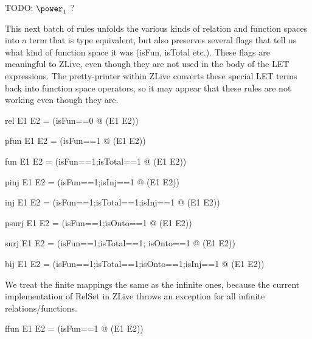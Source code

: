 \documentclass{article}
\begin{document}
TODO: $\power_1$ ?

This next batch of rules unfolds the various kinds of relation
and function spaces into a term that is type equivalent, but also
preserves several flags that tell us what kind of function space
it was (isFun, isTotal etc.).  These flags are meaningful to ZLive, 
even though they are not used in the body of the LET expressions.
The pretty-printer within ZLive converts these special LET terms
back into function space operators, so it may appear that these rules
are not working even though they are.

\begin{zedrule}{rel}
   E1 \rel E2 = (\LET isFun==0 @ \power (E1 \cross E2))
\end{zedrule}

\begin{zedrule}{pfun}
   E1 \pfun E2 = (\LET isFun==1 @ \power (E1 \cross E2))
\end{zedrule}

\begin{zedrule}{fun}
   E1 \fun E2 = (\LET isFun==1;isTotal==1 @ \power (E1 \cross E2))
\end{zedrule}

\begin{zedrule}{pinj}
   E1 \pinj E2 = (\LET isFun==1;isInj==1 @ \power (E1 \cross E2))
\end{zedrule}

\begin{zedrule}{inj}
   E1 \inj E2 = (\LET isFun==1;isTotal==1;isInj==1 @ \power (E1 \cross E2))
\end{zedrule}

\begin{zedrule}{psurj}
   E1 \psurj E2 = (\LET isFun==1;isOnto==1 @ \power (E1 \cross E2))
\end{zedrule}

\begin{zedrule}{surj}
   E1 \surj E2 = (\LET isFun==1;isTotal==1; isOnto==1 @ \power (E1 \cross E2))
\end{zedrule}

\begin{zedrule}{bij}
   E1 \bij E2 = (\LET isFun==1;isTotal==1;isOnto==1;isInj==1 
                  @ \power (E1 \cross E2))
\end{zedrule}

We treat the finite mappings the same as the infinite ones,
because the current implementation of RelSet in ZLive
throws an exception for all infinite relations/functions.
\begin{zedrule}{ffun}
   E1 \ffun E2 = (\LET isFun==1 @ \power (E1 \cross E2))
\end{zedrule}
\end{document}
